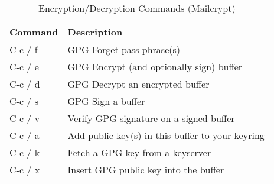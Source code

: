 \documentclass[11pt, a4paper]{article}
\begin{document}
\begin{table}[!ht]
  \caption{Encryption/Decryption Commands (Mailcrypt)}
  \begin{center}
    \begin{tabular}{l l}
      \hline
      Command   &       Description \\
      \hline
      C-c / f   &       GPG Forget pass-phrase(s) \\
      C-c / e   &       GPG Encrypt (and optionally sign) buffer \\
      C-c / d   &       GPG Decrypt an encrypted buffer \\
      C-c / s   &       GPG Sign a buffer \\
      C-c / v   &       Verify GPG signature on a signed buffer \\
      C-c / a   &       Add public key(s) in this buffer to your
                        keyring \\
      C-c / k   &       Fetch a GPG key from a keyserver \\
      C-c / x   &       Insert GPG public key into the buffer \\
      \hline
    \end{tabular}
  \end{center}
\end{table}
\end{document}

